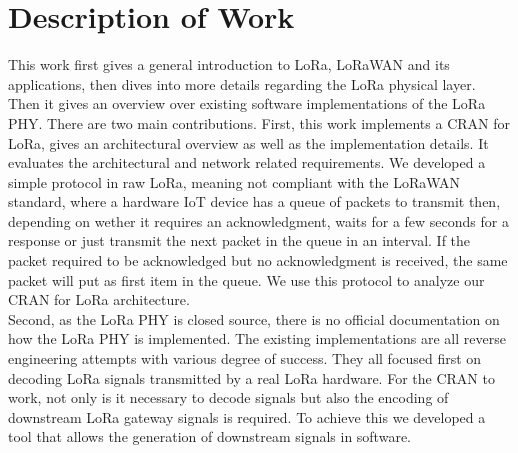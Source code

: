 \section{Description of Work}
This work first gives a general introduction to LoRa, LoRaWAN and its applications, then dives 
into more details regarding the LoRa physical layer. Then it gives an overview over existing 
software implementations of the LoRa PHY. There are two main contributions. First, this work 
implements a CRAN for LoRa, gives an architectural overview as well as the implementation details.
It evaluates the architectural and network related requirements. We developed a simple protocol in raw LoRa,
meaning not compliant with the LoRaWAN standard, where a hardware IoT device has a queue of packets to transmit then, depending on 
wether it requires an acknowledgment, waits for a few seconds for a response or just transmit the next packet in the queue in an interval.
If the packet required to be acknowledged but no acknowledgment is received, the same packet will put as first item in the queue.
We use this protocol to analyze our CRAN for LoRa architecture.
\\
Second, as the LoRa PHY is closed source, there is no official documentation on how the LoRa PHY is implemented.
The existing implementations are all reverse engineering attempts with various degree of success. 
They all focused first on decoding LoRa signals transmitted by a real LoRa hardware. For the CRAN to work, not only is it 
necessary to decode signals but also the encoding of downstream LoRa gateway signals is required. To achieve this we developed a tool 
that allows the generation of downstream signals in software.


